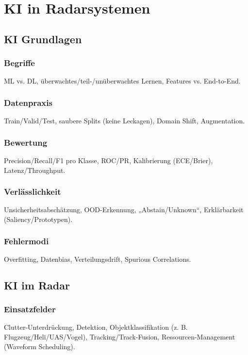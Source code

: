 \part{KI in Radarsystemen}
\chapter{KI Grundlagen}

\section{Begriffe}
ML vs. DL, überwachtes/teil-/unüberwachtes Lernen, Features vs. End-to-End.

\section{Datenpraxis}
Train/Valid/Test, saubere Splits (keine Leckagen), Domain Shift, Augmentation.

\section{Bewertung}
Precision/Recall/F1 pro Klasse, ROC/PR, Kalibrierung (ECE/Brier), Latenz/Throughput.

\section{Verlässlichkeit}
Unsicherheitsabschätzung, OOD-Erkennung, „Abstain/Unknown“, Erklärbarkeit (Saliency/Prototypen).

\section{Fehlermodi}
Overfitting, Datenbias, Verteilungsdrift, Spurious Correlations.




\chapter{KI im Radar}

\section{Einsatzfelder}
Clutter-Unterdrückung, Detektion, Objektklassifikation (z. B. Flugzeug/Heli/UAS/Vogel), 
Tracking/Track-Fusion, Ressourcen-Management (Waveform Scheduling).

